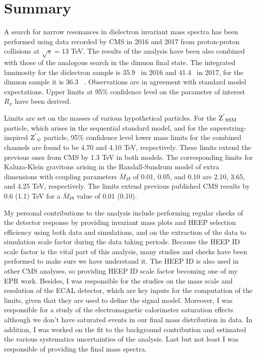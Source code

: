 \clearpage
\section{Summary}
\label{sec:Zprime_summary}


A search for narrow resonances in dielectron invariant mass spectra has been performed using data recorded by CMS in 2016 and 2017 from proton-proton collisions at $\sqrt{s} = 13$ TeV. The results of the analysis have been also combined with those of the analogous search in the dimuon final state.
The integrated luminosity for the dielectron sample is 35.9 \fbinv\ in 2016 and 41.4 \fbinv\ in 2017, for the dimuon sample it is 36.3 \fbinv\ . Observations are in agreement with standard model expectations. Upper limits at 95\% confidence level on the parameter of interest $R_{\sigma}$ have been derived.
 
Limits are set on the masses of various hypothetical particles. For the $\mathrm{Z^{'}}_\mathrm{SSM}$ particle,
which arises in the sequential standard model, and for the superstring-inspired $\mathrm{Z^{'}}_\mathrm{\psi}$ particle,
95\% confidence level lower mass limits for the combined channels are found to be 4.70
and 4.10 TeV, respectively. These limits extend the previous ones from CMS by 1.3 TeV in
both models. The corresponding limits for Kaluza-Klein gravitons arising in the Randall-Sundrum
model of extra dimensions with coupling parameters $\overline{M}_{Pl}$ of 0.01, 0.05, and 0.10 are 2.10, 3.65, and 4.25 TeV, respectively. The limits extend previous published CMS
results by 0.6 (1.1) TeV for a $\overline{M}_{Pl}$ value of 0.01 (0.10).

My personal contributions to the analysis include performing regular checks of the detector response by providing invariant mass
plots and HEEP selection efficiency using both data and simulations, and on the extraction of the data to simulation scale factor during the data taking periods. Because the HEEP ID scale factor is the vital part of this analysis, many studies and checks have been performed to make sure we have understand it. The HEEP ID is also used in other CMS analyses, so providing HEEP ID scale factor becoming one of my EPR work.
Besides, I was responsible for the studies on the mass scale and resolution of the ECAL detector, which are key inputs for the computation of the limits, given that they are used to define the signal model. Moreover, I was responsible for a study of the electromagnetic calorimeter saturation effects although we don't have saturated events in our final mass distribution in data. In addition, I was worked on the fit to the background contribution and estimated the various systematics uncertainties of the analysis. Last but not least I was responsible of providing the final mass spectra.

